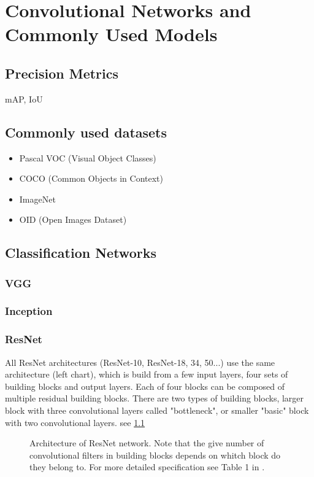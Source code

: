 \chapter{Convolutional Networks and Commonly Used Models}
\label{chapt:models}
\section{Precision Metrics}
mAP, IoU

\section{Commonly used datasets}
\label{sec:datasets}
\begin{itemize}
    \item Pascal VOC (Visual Object Classes)
    \item COCO (Common Objects in Context)
    \item ImageNet
    \item OID (Open Images Dataset)
\end{itemize}

\section{Classification Networks}
\subsection{VGG}
\label{sec:VGG}
\subsection{Inception}
\label{sec:inception}
\subsection{ResNet}
\label{sec:resnet}

All ResNet \cite{bib:resnet} architectures (ResNet-10, ResNet-18, 34, 50...) use the same architecture (left chart), which is build from a few input layers, four sets of building blocks and output layers. Each of four blocks can be composed of multiple residual building blocks. There are two types of building blocks, larger block with three convolutional layers called "bottleneck", or smaller "basic" block with two convolutional layers.  see \cref{fig:resnet_arch}

\begin{figure}
    \label{fig:resnet_arch}
    \resnetArch
    \caption{Architecture of ResNet network.
    Note that the give number of convolutional filters in building blocks depends on whitch block do they belong to. For more detailed specification see Table 1 in  \cite{bib:resnet}.}
\end{figure}

